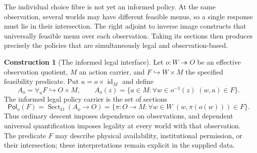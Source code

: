 \documentclass[11pt,a4paper]{article}
\numberwithin{equation}{section}
\theoremstyle{definition}
\newtheorem{construction}[construction]{Construction}
\theoremstyle{remark}
\theoremstyle{plain}
\begin{document}
The individual choice fibre is not yet an informed policy. At the
same observation, several worlds may have different feasible menus, so
a single response must lie in their intersection. The right adjoint to
inverse image constructs that universally feasible menu over each
observation. Taking its sections then produces precisely the policies
that are simultaneously legal and observation-based.

\begin{construction}[The informed legal interface]
\label{con:egt-informed-legal-interface}
Let $o:W\twoheadrightarrow O$ be an effective observation quotient,
$M$ an action carrier, and $F\hookrightarrow W\times M$ the specified
feasibility predicate. Put $u=o\times\operatorname{id}_M$ and define
\[
 A_o=\forall_u F\hookrightarrow O\times M,\qquad
 A_o(z)=\{a\in M:\forall w\in o^{-1}(z)\;(w,a)\in F\}.
\]
The informed legal policy carrier is the set of sections
\[
 \mathsf{Pol}_o(F)
 =\operatorname{Sect}_O(A_o\to O)
 =\{\pi:O\to M:\forall w\in W\;(w,\pi(o(w)))\in F\}.
\]
Thus ordinary descent imposes dependence on observations, and dependent
universal quantification imposes legality at every world with that
observation. The predicate $F$ may describe physical availability,
institutional permission, or their intersection; these interpretations
remain explicit in the supplied data.
\end{construction}
\end{document}
